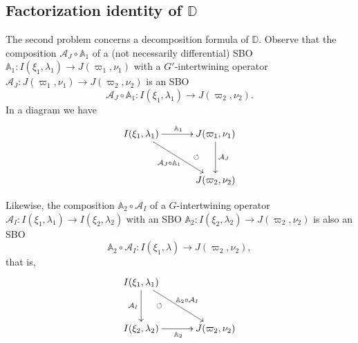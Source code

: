 \documentclass[reqno,11pt]{amsart}
\theoremstyle{remark}
\theoremstyle{definition}
\numberwithin{equation}{section}
\newcommand{\Cal}{\mathcal}
\newcommand{\bD}{\mathbb{D}}
\newcommand{\A}{\Cal{A}}
\newcommand{\bA}{\mathbb{A}}
\begin{document}
\subsection{Factorization identity of $\bD$}

The second problem concerns a decomposition formula of $\bD$.
Observe that the composition $\A_J\circ \bA_1$ of a
(not necessarily differential) SBO 
$\bA_1 \colon I(\xi_1,\lambda_1) \to J(\varpi_1, \nu_1)$ with 
a $G'$-intertwining operator 
$\A_J\colon J(\varpi_1, \nu_1) \to J(\varpi_2, \nu_2)$ is an SBO
\begin{equation*}
\A_J\circ \bA_1 \colon I(\xi_1,\lambda_1) \to J(\varpi_2, \nu_2).
\end{equation*}
In a diagram we have
\begin{equation*}
\begin{aligned}
\xymatrix@=13pt{
I(\xi_1,\lambda_1)
  \ar[rrdd]_{\A_J\circ \bA_1}
  \ar[rr]^{\bA_1}
 && J(\varpi_1,\nu_1)
   \ar[dd]^{\A_J}
  \ar@{}[ldd]|{\circlearrowleft}
 \\
&&\\
&&
J(\varpi_2,\nu_2)
}
\end{aligned}
\end{equation*}

\noindent
Likewise, the composition $\bA_2 \circ \A_I$
of a $G$-intertwining operator 
$\A_I \colon I(\xi_1, \lambda_1) \to I(\xi_2, \lambda_2)$ with 
an SBO $\bA_2 \colon I(\xi_2,\lambda_2) \to J(\varpi_2, \nu_2)$
is also an SBO
\begin{equation*}
\bA_2\circ \A_I \colon I(\xi_1,\lambda) \to J(\varpi_2, \nu_2),
\end{equation*}
that is,
\begin{equation*}\label{eqn:intro-factor2}
\begin{aligned}
\xymatrix@=13pt{
I(\xi_1,\lambda_1)
 \ar[dd]_{\A_I}
  \ar[rrdd]^{\bA_2\circ \A_I }
 && 
 \\
&&\\
I(\xi_2,\lambda_2)
\ar[rr]_{\bA_2}   \ar@{}[ruu]|{\circlearrowleft}
&&
J(\varpi_2,\nu_2)
}
\end{aligned}
\end{equation*}
\end{document}
